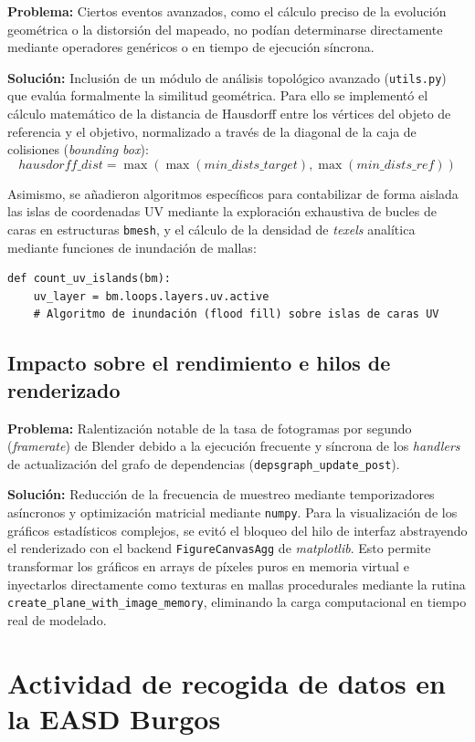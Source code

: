 \textbf{Problema:} Ciertos eventos avanzados, como el cálculo preciso de la evolución geométrica o la distorsión del mapeado, no podían determinarse directamente mediante operadores genéricos o en tiempo de ejecución síncrona.

\textbf{Solución:} Inclusión de un módulo de análisis topológico avanzado (\texttt{utils.py}) que evalúa formalmente la similitud geométrica. Para ello se implementó el cálculo matemático de la distancia de Hausdorff entre los vértices del objeto de referencia y el objetivo, normalizado a través de la diagonal de la caja de colisiones (\textit{bounding box}):
$$hausdorff\_dist = \max(\max(min\_dists\_target), \max(min\_dists\_ref))$$

Asimismo, se añadieron algoritmos específicos para contabilizar de forma aislada las islas de coordenadas UV mediante la exploración exhaustiva de bucles de caras en estructuras \texttt{bmesh}, y el cálculo de la densidad de \textit{texels} analítica mediante funciones de inundación de mallas:
\begin{verbatim}
def count_uv_islands(bm):
    uv_layer = bm.loops.layers.uv.active
    # Algoritmo de inundación (flood fill) sobre islas de caras UV
\end{verbatim}

\subsection{Impacto sobre el rendimiento e hilos de renderizado}

\textbf{Problema:} Ralentización notable de la tasa de fotogramas por segundo (\textit{framerate}) de Blender debido a la ejecución frecuente y síncrona de los \textit{handlers} de actualización del grafo de dependencias (\texttt{depsgraph\_update\_post}).

\textbf{Solución:} Reducción de la frecuencia de muestreo mediante temporizadores asíncronos y optimización matricial mediante \texttt{numpy}. Para la visualización de los gráficos estadísticos complejos, se evitó el bloqueo del hilo de interfaz abstrayendo el renderizado con el backend \texttt{FigureCanvasAgg} de \textit{matplotlib}. Esto permite transformar los gráficos en arrays de píxeles puros en memoria virtual e inyectarlos directamente como texturas en mallas procedurales mediante la rutina \texttt{create\_plane\_with\_image\_memory}, eliminando la carga computacional en tiempo real de modelado.

\section{Actividad de recogida de datos en la EASD Burgos}

